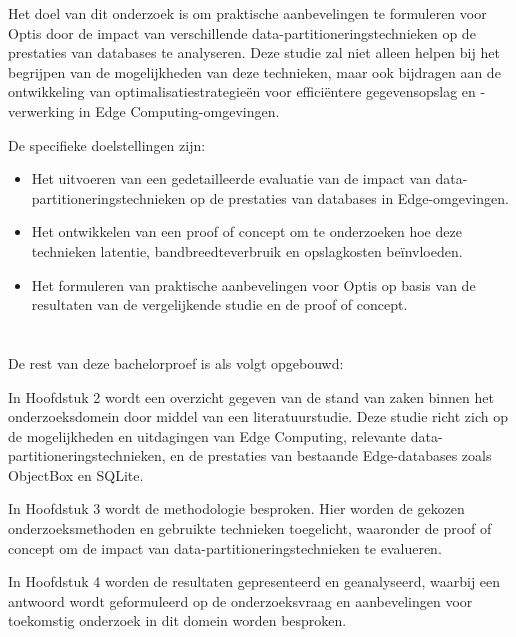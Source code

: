 Het doel van dit onderzoek is om praktische aanbevelingen te formuleren voor Optis door de impact van verschillende data-partitioneringstechnieken op de prestaties van databases te analyseren. Deze studie zal niet alleen helpen bij het begrijpen van de mogelijkheden van deze technieken, maar ook bijdragen aan de ontwikkeling van optimalisatiestrategieën voor efficiëntere gegevensopslag en -verwerking in Edge Computing-omgevingen.

De specifieke doelstellingen zijn:
\begin{itemize}
  \item Het uitvoeren van een gedetailleerde evaluatie van de impact van data-partitioneringstechnieken op de prestaties van databases in Edge-omgevingen.
  \item Het ontwikkelen van een proof of concept om te onderzoeken hoe deze technieken latentie, bandbreedteverbruik en opslagkosten beïnvloeden.
  \item Het formuleren van praktische aanbevelingen voor Optis op basis van de resultaten van de vergelijkende studie en de proof of concept.
\end{itemize}

\section{}%
\label{sec:opzet-bachelorproef}

De rest van deze bachelorproef is als volgt opgebouwd:

In Hoofdstuk 2 wordt een overzicht gegeven van de stand van zaken binnen het onderzoeksdomein door middel van een literatuurstudie. Deze studie richt zich op de mogelijkheden en uitdagingen van Edge Computing, relevante data-partitioneringstechnieken, en de prestaties van bestaande Edge-databases zoals ObjectBox en SQLite.

In Hoofdstuk 3 wordt de methodologie besproken. Hier worden de gekozen onderzoeksmethoden en gebruikte technieken toegelicht, waaronder de proof of concept om de impact van data-partitioneringstechnieken te evalueren.

In Hoofdstuk 4 worden de resultaten gepresenteerd en geanalyseerd, waarbij een antwoord wordt geformuleerd op de onderzoeksvraag en aanbevelingen voor toekomstig onderzoek in dit domein worden besproken.

\section{}%
\label{sec:deelvragen}

